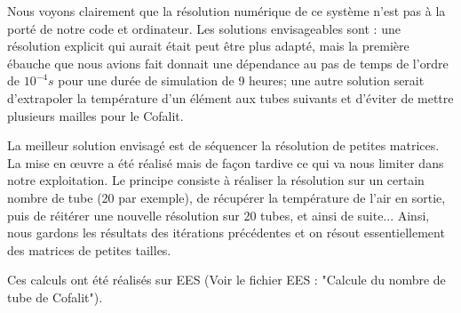 Nous voyons clairement que la résolution numérique de ce système n'est pas à la porté de notre code et ordinateur. Les solutions envisageables sont : une résolution explicit qui aurait était peut être plus adapté, mais la première ébauche que nous avions fait donnait une dépendance au pas de temps de l'ordre de $10^{-4} s$ pour une durée de simulation de 9 heures; une autre solution serait d'extrapoler la température d'un élément aux tubes suivants et d'éviter de mettre plusieurs mailles pour le Cofalit.

La meilleur solution envisagé est de séquencer la résolution de petites matrices. La mise en œuvre a été réalisé mais de façon tardive ce qui va nous limiter dans notre exploitation. Le principe consiste à réaliser la résolution sur un certain nombre de tube (20 par exemple), de récupérer la température de l'air en sortie, puis de réitérer une nouvelle résolution sur 20 tubes, et ainsi de suite... Ainsi, nous gardons les résultats des itérations précédentes et on résout essentiellement des matrices de petites tailles.








Ces calculs ont été réalisés sur EES (Voir le fichier EES : "Calcule du nombre de tube de Cofalit").

